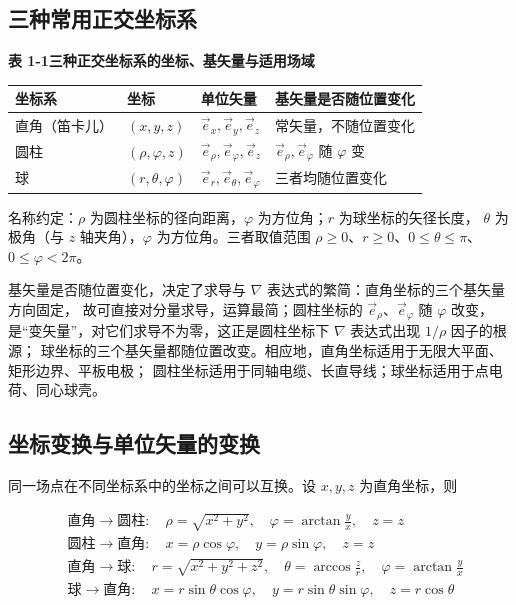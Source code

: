 \subsection{三种常用正交坐标系}

\begin{table}[htbp]
\centering
{\small\textbf{表 1-1\quad 三种正交坐标系的坐标、基矢量与适用场域}}\\[2pt]
\small
\begin{tabular}{@{}llll@{}}
\toprule
坐标系 & 坐标 & 单位矢量 & 基矢量是否随位置变化 \\
\midrule
直角（笛卡儿） & $(x,y,z)$ & $\vec{e}_x,\vec{e}_y,\vec{e}_z$ & 常矢量，不随位置变化 \\
圆柱 & $(\rho,\varphi,z)$ & $\vec{e}_\rho,\vec{e}_\varphi,\vec{e}_z$ & $\vec{e}_\rho,\vec{e}_\varphi$ 随 $\varphi$ 变 \\
球 & $(r,\theta,\varphi)$ & $\vec{e}_r,\vec{e}_\theta,\vec{e}_\varphi$ & 三者均随位置变化 \\
\bottomrule
\end{tabular}
\end{table}

名称约定：$\rho$ 为圆柱坐标的径向距离，$\varphi$ 为方位角；$r$ 为球坐标的矢径长度，
$\theta$ 为极角（与 $z$ 轴夹角），$\varphi$ 为方位角。三者取值范围
$\rho\ge 0$、$r\ge 0$、$0\le\theta\le\pi$、$0\le\varphi<2\pi$。

基矢量是否随位置变化，决定了求导与 $\nabla$ 表达式的繁简：直角坐标的三个基矢量方向固定，
故可直接对分量求导，运算最简；圆柱坐标的 $\vec{e}_\rho$、$\vec{e}_\varphi$ 随 $\varphi$ 改变，
是“变矢量”，对它们求导不为零，这正是圆柱坐标下 $\nabla$ 表达式出现 $1/\rho$ 因子的根源；
球坐标的三个基矢量都随位置改变。相应地，直角坐标适用于无限大平面、矩形边界、平板电极；
圆柱坐标适用于同轴电缆、长直导线；球坐标适用于点电荷、同心球壳。

\subsection{坐标变换与单位矢量的变换}

同一场点在不同坐标系中的坐标之间可以互换。设 $x,y,z$ 为直角坐标，则
\begin{formulaBox}
\[
\begin{aligned}
&\text{直角}\to\text{圆柱}:\quad \rho=\sqrt{x^2+y^2},\quad \varphi=\arctan\frac{y}{x},\quad z=z\\
&\text{圆柱}\to\text{直角}:\quad x=\rho\cos\varphi,\quad y=\rho\sin\varphi,\quad z=z\\
&\text{直角}\to\text{球}:\quad r=\sqrt{x^2+y^2+z^2},\quad \theta=\arccos\frac{z}{r},\quad \varphi=\arctan\frac{y}{x}\\
&\text{球}\to\text{直角}:\quad x=r\sin\theta\cos\varphi,\quad y=r\sin\theta\sin\varphi,\quad z=r\cos\theta
\end{aligned}
\]
\end{formulaBox}

